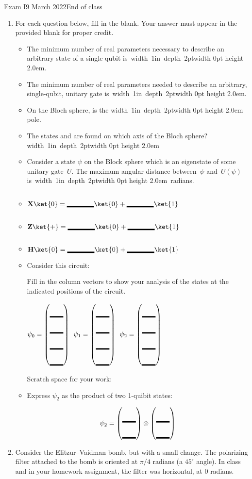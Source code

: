 \documentclass[12pt]{article}
\def\Gate#1{\mbox{\textbf{#1}}}
\def\X{\Gate{X}}
\def\Z{\Gate{Z}}
\def\H{\Gate{H}}
\def\QZero{\ket{0}}
\def\QState#1{\ensuremath{\psi_{#1}}}
\newcommand{\Blank}[1][1in]{\mbox{\vrule width #1 depth 2pt}\vrule width 0pt height 2.0em}
\def\BlQb{\mbox{\ensuremath{\Blank[4em]\ket{0}+\Blank[4em]\ket{1}}}}
\def\SQB#1#2{%
\ensuremath{%
\begin{pmatrix*}[r] #1 \\ #2\end{pmatrix*}}}
\def\SQBB{\SQB{\Blank[2em]}{\Blank[2em]}}
\def\DQB#1#2#3#4{%
\ensuremath{%
\begin{pmatrix*}[r] #1 \\ #2 \\ #3 \\ #4\end{pmatrix*}}}
\def\DQBB{\DQB{\Blank[2em]}{\Blank[2em]}{\Blank[2em]}{\Blank[2em]}}
\begin{document}
\begin{assignment}{Exam I}{9 March 2022}{End of class}
\begin{enumerate}
\item{} For each question below, fill in the blank.  Your answer must appear in the provided blank for proper credit.
\begin{itemize}
    \item The minimum number of real parameters necessary to describe an arbitrary state of a single qubit is~\Blank{}.
    \item The minimum number of real parameters needed to describe an arbitrary, single-qubit, unitary gate is~\Blank{}.
    \item On the Bloch sphere,  is the \Blank{} pole.
    \item The states \ket{+} and \ket{-} are found on which axis of the Bloch sphere? \Blank{}
    \item Consider a state $\psi$ on the Block sphere which is an eigenstate of some unitary gate~$U$.  The maximum angular distance between~$\psi$ and~$U(\psi)$ is~\Blank{}~radians.
    \item $\X\ket{0}=\BlQb$
    \item $\Z\ket{+}=\BlQb$
    \item $\H{\ket{0}}=\BlQb$
    \item Consider this circuit:
    
    \adjustbox{valign=t}{\begin{quantikz}
\lstick{\QZero{}}&\gate{X}\slice{\QState{0}} & \ctrl{1}\slice{\QState{1}} & \gate{H}\slice{\QState{1}}  & \qw\\
\lstick{\QZero{}} &\qw & \targ{} &  \qw    &  \qw
\end{quantikz}}

Fill in the column vectors to show your analysis of the states at the indicated positions of the circuit.

$\QState{0}=\DQBB{}$  $\QState{1}=\DQBB{}$  $\QState{2}=\DQBB{}$

Scratch space for your work:

\vskip 2in
\item Express \QState{2} as the product of two 1-quibit states:

\[\QState{2} = \SQBB \otimes \SQBB \]

\end{itemize}


\clearpage\item{}
Consider the Elitzur--Vaidman bomb, but with a small change.  The
polarizing filter attached to the bomb is
oriented at $\pi/4$ radians (a $45^{\circ}$ angle).  In class and in your homework assignment,
the filter was horizontal, at $0$ radians.


\end{enumerate}
\end{assignment}
\end{document}
